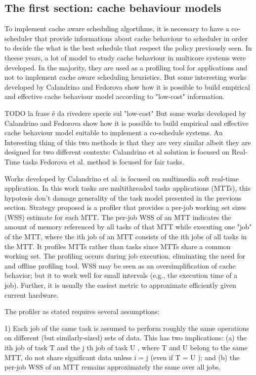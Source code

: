 \documentclass[a4paper,10pt]{article}
\begin{document}
\begin{multicols}{2}
\section{The first section: cache behaviour models}

To implement cache aware scheduling algortihms, it is necessary to have a co-scheduler that provide informations about cache behaviour
to scheduler in order to decide the what is the best schedule that respect the policy previously seen.
In theese years, a lot of model to study cache behaviour in multicore systems were developed. In the majority, they are used as a profiling tool for
applications and not to implement cache aware scheduling heuristics. But some interesting works developed by Calandrino and Fedorova show how it is 
possible to build empirical and effective cache behaviour model according to "low-cost" information.

TODO la frase \'e da rivedere specie sul "low-cost"
But some works developed by Calandrino and Fedorova show how it is possible to build empirical and effective cache behaviour model
suitable to implement a co-schedule systems. An Interesting thing of this two methods is that they are very similar albeit they are designed for two 
different contexts: Calandrino et al solution is focused on Real-Time tasks Fedorova et al. method is focused for fair tasks.

Works developed by Calandrino et al. is focused on multimedia soft real-time application. In this work tasks are multithreaded tasks applications (MTTs),
this hypotesis don't damage generality of the task model presented in the previous section.
Strategy proposed is a profiler that provides a per-job working set sizes (WSS) estimate for each MTT. The per-job WSS of an MTT indicates the amount 
of memory referenced by all tasks of that MTT while executing one "job" of the MTT, where the ith job of an MTT consists of the ith jobs of all tasks in
the MTT. It profiles MTTs rather than tasks since MTTs share a common working set. The profiling occurs during job execution, eliminating the need 
for and offline profiling tool. WSS may be seen as an oversimplification of cache behavior; but it to work well for 
small intervals (e.g., the execution time of a job). Further, it is usually the easiest metric to approximate efficiently given current hardware.

The profiler as stated requires several assumptions:
 
1) Each job of the same task is assumed to perform roughly the same operations on different (but similarly-sized) sets of data.
This has two implications: (a) the ith job of task T and the j th job of task U , where T and U belong to the same MTT, do not share
significant data unless i = j (even if T = U ); and (b) the per-job WSS of an MTT remains approximately the same over all jobs.


\end{multicols}
\end{document}
